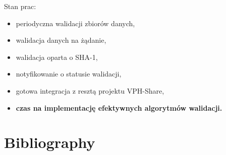 \documentclass{beamer}
\begin{document}
\begin{frame}
\begin{block}{Stan prac:}
\begin{itemize}
	\item periodyczna walidacji zbiorów danych,
	\item walidacja danych na żądanie,
	\item walidacja oparta o SHA-1,
	\item notyfikowanie o statusie walidacji,
	\item gotowa integracja z resztą projektu VPH-Share,
	\item \textbf{czas na implementację efektywnych algorytmów walidacji.}
\end{itemize}
\end{block}
\end{frame}



\section*{Bibliography}
\nocite{*}
%

\end{document}
